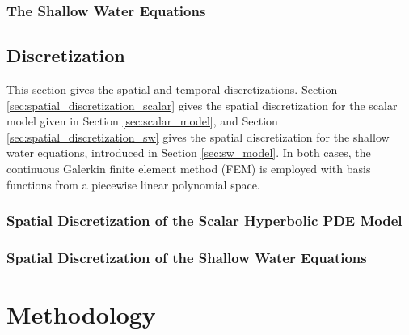 \documentclass[12pt]{article}
\newcommand{\contentdir}{../dissertation/content}
\begin{document}
\subsubsection{The Shallow Water Equations\label{sec:sw_model}}


\subsection{Discretization}
This section gives the spatial and temporal discretizations. Section
\ref{sec:spatial_discretization_scalar} gives the spatial discretization
for the scalar model given in Section \ref{sec:scalar_model}, and
Section \ref{sec:spatial_discretization_sw} gives the spatial discretization
for the shallow water equations, introduced in Section \ref{sec:sw_model}.
In both cases, the continuous Galerkin finite element method (FEM) is employed
with basis functions from a piecewise linear polynomial space.

\subsubsection{Spatial Discretization of the Scalar Hyperbolic PDE Model
\label{sec:spatial_discretization_scalar}}


\subsubsection{Spatial Discretization of the Shallow Water Equations
\label{sec:spatial_discretization_sw}}


\section{Methodology\label{sec:methodology}}
\end{document}

